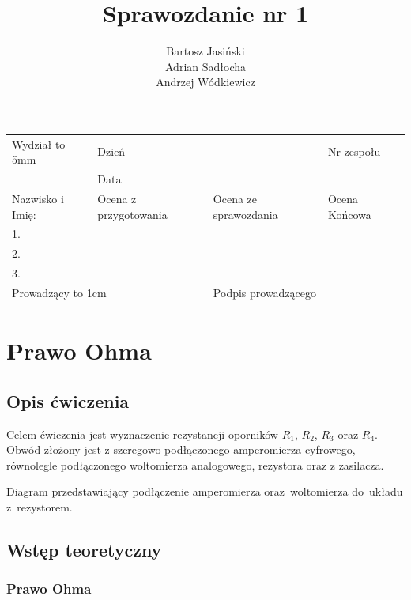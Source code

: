 \documentclass[a4paper]{article}
\title{Sprawozdanie nr 1}
\author{
Bartosz Jasiński \\
Adrian Sadłocha \\
Andrzej Wódkiewicz
}
\newlength{\du}
\newcommand{\Vsp}[1]{\vtop to #1 {}}
\newcommand{\Small}{\scriptsize}
\begin{document}
\begin{center}
\begin{tabular}{|p{5cm}|l|l|l|}
    \hline
    Wydział \Vsp{5mm} & \multicolumn{1}{|l}{Dzień} &  & Nr zespołu\\
    & \multicolumn{1}{|l}{Data} &  & \\
    \hline 
    Nazwisko i Imię: & \Small Ocena z przygotowania  & \Small Ocena ze sprawozdania & \Small Ocena Końcowa \\
    1. & & &\\
    2. & & & \\
    3. & & & \\
    \hline
    \multicolumn{2}{|l|}{Prowadzący \Vsp{1cm}} & \multicolumn{2}{|l|}{Podpis prowadzącego} \\
    \hline
\end{tabular}
\end{center}

{\let\newpage\relax\maketitle}  %
\setcounter{secnumdepth}{2}
\setcounter{tocdepth}{2}

\section{Prawo Ohma}

\subsection{Opis ćwiczenia}

Celem ćwiczenia jest wyznaczenie rezystancji oporników $R_1$, $R_2$, $R_3$ oraz $R_4$.
Obwód złożony jest z szeregowo podłączonego amperomierza cyfrowego, równolegle podłączonego woltomierza analogowego, rezystora oraz z zasilacza.

\begin{table}

\caption{Diagram przedstawiający podłączenie amperomierza oraz~woltomierza do~układu z~rezystorem.}
\end{table}

\subsection{Wstęp teoretyczny}

\subsubsection{Prawo Ohma}
\end{document}
